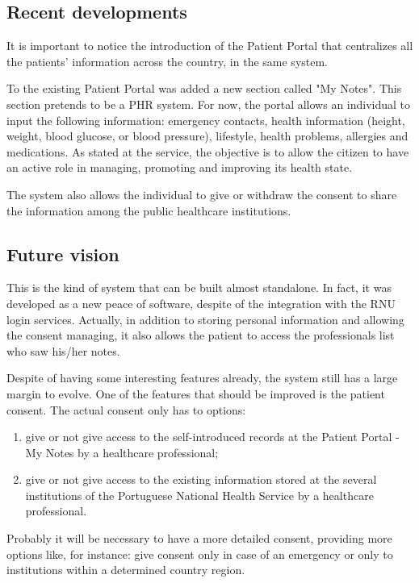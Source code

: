 \subsection{Recent developments}

It is important to notice the introduction of the Patient Portal that centralizes all the patients' information across the country, in the same system.

To the existing Patient Portal was added a new section called "My Notes". This section pretends to be a PHR system. For now, the portal allows an individual to input the following information: emergency contacts, health information (height, weight, blood glucose, or blood pressure), lifestyle, health problems, allergies and medications. As stated at the service, the objective is to allow the citizen to have an active role in managing, promoting and improving its health state.

The system also allows the individual to give or withdraw the consent to share the information among the public healthcare institutions.

\subsection{Future vision}
This is the kind of system that can be built almost standalone. In fact, it was developed as a new peace of software, despite of the integration with the RNU login services. Actually, in addition to storing personal information and allowing the consent managing, it also allows the patient to access the professionals list who saw his/her notes.

Despite of having some interesting features already, the system still has a large margin to evolve. One of the features that should be improved is the patient consent. The actual consent only has to options:
\begin{enumerate}
\item give or not give access to the self-introduced records at the Patient Portal - My Notes by a healthcare professional;
\item give or not give access to the existing information stored at the several institutions of the Portuguese National Health Service by a healthcare professional.
\end{enumerate}

Probably it will be necessary to have a more detailed consent, providing more options like, for instance: give consent only in case of an emergency or only to institutions within a determined country region.

